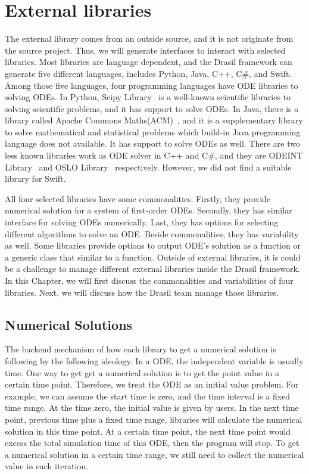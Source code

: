 \chapter{External libraries}
The external library comes from an outside source, and it is not originate from the source project. Thus, we will generate interfaces to interact with selected libraries. Most libraries are language dependent, and the Drasil framework can generate five different languages, includes Python, Java, C++, C\#, and Swift. Among those five languages, four programming languages have ODE libraries to solving ODEs. In Python, Scipy Library~\citep{scipy} is a well-known scientific libraries to solving scientific problems, and it has support to solve ODEs. In Java, there is a library called Apache Commons Maths(ACM)~\citep{apache}, and it is a supplementary library to solve mathematical and statistical problems which build-in Java programming language does not available. It has support to solve ODEs as well. There are two less known libraries work as ODE solver in C++ and C\#, and they are ODEINT Library~\citep{odeint} and OSLO Library~\citep{oslo} respectively. However, we did not find a suitable library for Swift. 

All four selected libraries have some commonalities. Firstly, they provide numerical solution for a system of first-order ODEs. Secondly, they has similar interface for solving ODEs numerically. Last, they has options for selecting different algorithms to solve an ODE. Beside commonalities, they has variability as well. Some libraries provide options to output ODE's solution as a function or a generic class that similar to a function. Outside of external libraries, it is could be a challenge to manage different external libraries inside the Drasil framework. In this Chapter, we will first discuss the commonalities and variabilities of four libraries. Next, we will discuss how the Drasil team manage those libraries.

\section{Numerical Solutions}
The backend mechanism of how each library to get a numerical solution is following by the following ideology. In a ODE, the independent variable is usually time. One way to get get a numerical solution is to get the point value in a certain time point. Therefore, we treat the ODE as an initial value problem. For example, we can assume the start time is zero, and the time interval is a fixed time range. At the time zero, the initial value is given by users. In the next time point, previous time plus a fixed time range, libraries will calculate the numerical solution in this time point. At a certain time point, the next time point would excess the total simulation time of this ODE, then the program will stop. To get a numerical solution in a certain time range, we still need to collect the numerical value in each iteration. 

